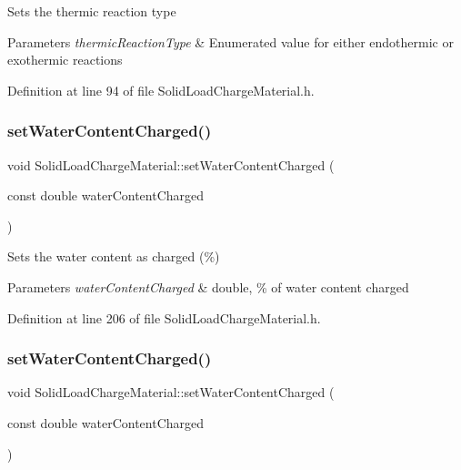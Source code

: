 Sets the thermic reaction type 
\begin{DoxyParams}{Parameters}
{\em thermic\+Reaction\+Type} & Enumerated value for either endothermic or exothermic reactions \\
\hline
\end{DoxyParams}


Definition at line 94 of file Solid\+Load\+Charge\+Material.\+h.

\mbox{\label{class_solid_load_charge_material_abf43422318a1b9120dff1dcfb15d5265}} 
\subsubsection{\texorpdfstring{set\+Water\+Content\+Charged()}{setWaterContentCharged()}\hspace{0.1cm}{\footnotesize\ttfamily [1/3]}}
{\footnotesize\ttfamily void Solid\+Load\+Charge\+Material\+::set\+Water\+Content\+Charged (\begin{DoxyParamCaption}\item[{const double}]{water\+Content\+Charged }\end{DoxyParamCaption})\hspace{0.3cm}{\ttfamily [inline]}}

Sets the water content as charged (\%) 
\begin{DoxyParams}{Parameters}
{\em water\+Content\+Charged} & double, \% of water content charged \\
\hline
\end{DoxyParams}


Definition at line 206 of file Solid\+Load\+Charge\+Material.\+h.

\mbox{\label{class_solid_load_charge_material_abf43422318a1b9120dff1dcfb15d5265}} 
\subsubsection{\texorpdfstring{set\+Water\+Content\+Charged()}{setWaterContentCharged()}\hspace{0.1cm}{\footnotesize\ttfamily [2/3]}}
{\footnotesize\ttfamily void Solid\+Load\+Charge\+Material\+::set\+Water\+Content\+Charged (\begin{DoxyParamCaption}\item[{const double}]{water\+Content\+Charged }\end{DoxyParamCaption})\hspace{0.3cm}{\ttfamily [inline]}}

